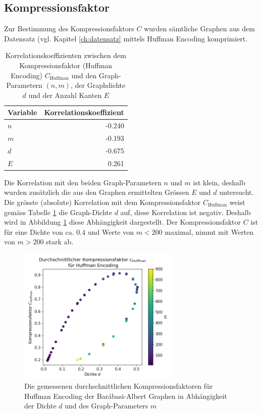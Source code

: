 \documentclass{ffhsthesis}
\begin{document}
\subsection{Kompressionsfaktor}
\label{ch:compress_c_h}
Zur Bestimmung des Kompressionsfaktors $C$ wurden sämtliche Graphen aus dem Datensatz (vgl. Kapitel \ref{ch:datensatz} mittels Huffman Encoding komprimiert. 

\begin{table}[h!]
\centering
\begin{tabular}{@{}lr@{}}
\toprule
Variable    & Korrelationskoeffizient \\
\midrule
$n$ &        -0.240 \\
$m$ &        -0.193 \\
$d$ &        -0.675 \\
$E$ &         0.261 \\
\bottomrule
\end{tabular}
\caption{Korrelationskoeffizienten zwischen dem Kompressionsfaktor (Huffman Encoding) $C_{\text{Huffman}}$ und den Graph-Parametern $(n,m)$, der Graphdichte $d$ und der Anzahl Kanten $E$}
\label{tab:coefficients2}
\end{table}
Die Korrelation mit den beiden Graph-Parametern $n$ und $m$ ist klein, deshalb wurden zusätzlich die aus den Graphen ermittelten Grössen $E$ und $d$ untersucht. Die grösste (absolute) Korrelation mit dem Kompressionsfaktor $C_{\text{Huffman}}$ weist gemäss Tabelle \ref{tab:coefficients2} die Graph-Dichte $d$ auf, diese Korrelation ist negativ. 
Deshalb wird in Abbildung \ref{fig:chuffman} diese Abhängigkeit dargestellt.
Der Kompressionsfaktor $C$ ist für eine Dichte von ca. $0.4$ und Werte von $m<200$ maximal, nimmt mit Werten von $m>200$ stark ab.
\begin{figure}[h!]
    \centering
    \includegraphics[width=0.7\textwidth]{images/avg_huffman_compression_density_no_outliers_color.png}
    \caption{Die gemessenen durchschnittlichen Kompressionsfaktoren für Huffman Encoding der Barábasi-Albert Graphen in Abhängigkeit der Dichte $d$ und des Graph-Parameters $m$}
    \label{fig:chuffman}
\end{figure}
\end{document}
